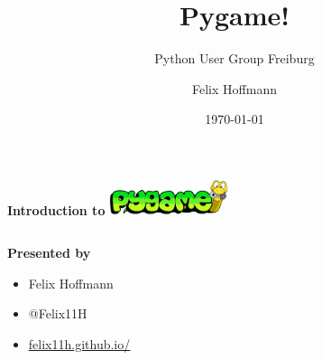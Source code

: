 \documentclass[handout]{beamer}   %
\title{Pygame!}
\subtitle{Python User Group Freiburg}
\author[Felix Hoffmann]{Felix Hoffmann}
\institute{\url{http://about.me/felixhoffmann}}
\date{\today}
\begin{document}






\begin{frame}[fragile]
  \begin{center} 
    \LARGE \textbf{Introduction to} \includegraphics[width=3.5cm]{img/pygame.png}
  \end{center}
  
  \vspace{0.45cm}

  \begin{columns}[t]
    \begin{column}{0.44\textwidth}        
      \textbf{Presented by}
      \normalsize
      \vspace{0.18cm}
      \begin{itemize}%
        \setlength{\itemindent}{-0.3cm}
        \item[] Felix Hoffmann
        \item[] @Felix11H
        \item[] \href{http://felix11h.github.io/}{felix11h.github.io/}
      \end{itemize}


\end{column}
\end{columns}
\end{frame}
\end{document}
